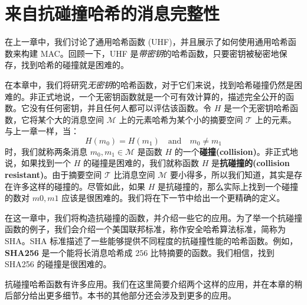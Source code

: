 \chapter{来自抗碰撞哈希的消息完整性}\label{chap:8}

在上一章中，我们讨论了通用哈希函数 (UHF)，并且展示了如何使用通用哈希函数来构建 MAC。回顾一下，UHF 是\emph{带密钥}的哈希函数，只要密钥被秘密地保存，找到哈希的碰撞就是困难的。

在本章中，我们将研究\emph{无密钥}的哈希函数，对于它们来说，找到哈希碰撞仍然是困难的。非正式地说，一个无密钥函数就是一个可有效计算的，描述完全公开的函数。它没有任何密钥，并且任何人都可以评估该函数。令 $H$ 是一个无密钥哈希函数，它将某个大的消息空间 $\mathcal{M}$ 上的元素哈希为某个小的摘要空间 $\mathcal{T}$ 上的元素。与上一章一样，当：
\[
H(m_0)=H(m_1)
\quad\text{and}\quad
m_0\neq m_1
\]
时，我们就称两条消息 $m_0,m_1\in\mathcal{M}$ 是函数 $H$ 的一个\textbf{碰撞(collision)}。非正式地说，如果找到一个 $H$ 的碰撞是困难的，我们就称函数 $H$ 是\textbf{抗碰撞的(collision resistant)}。由于摘要空间 $\mathcal{T}$ 比消息空间 $\mathcal{M}$ 要小得多，所以我们知道，其实是存在许多这样的碰撞的。尽管如此，如果 $H$ 是抗碰撞的，那么实际上找到一个碰撞的数对 $m0,m1$ 应该是很困难的。我们将在下一节中给出一个更精确的定义。

在这一章中，我们将构造抗碰撞的函数，并介绍一些它的应用。为了举一个抗碰撞函数的例子，我们会介绍一个美国联邦标准，称作安全哈希算法标准，简称为 SHA。SHA 标准描述了一些能够提供不同程度的抗碰撞性能的哈希函数。例如，\textbf{SHA256} 是一个能将长消息哈希成 $256$ 比特摘要的函数。我们相信，找到 SHA256 的碰撞是很困难的。

抗碰撞哈希函数有许多应用。我们在这里简要介绍两个这样的应用，并在本章的稍后部分给出更多细节。本书的其他部分还会涉及到更多的应用。

